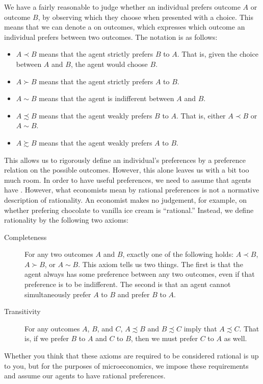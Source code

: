 We have a fairly reasonable to judge whether an individual prefers outcome $A$ or outcome $B$, by observing which they choose when presented with a choice. This means that we can denote a  on outcomes, which expresses which outcome an individual prefers between two outcomes. The notation is as follows:
\begin{itemize}
    \item $A \prec B$ means that the agent strictly prefers $B$ to $A$. That is, given the choice between $A$ and $B$, the agent would choose $B$.
    \item $A \succ B$ means that the agent strictly prefers $A$ to $B$.
    \item $A \sim B$ means that the agent is indifferent between $A$ and $B$.
    \item $A \precsim B$ means that the agent weakly prefers $B$ to $A$. That is, either $A \prec B$ or $A \sim B$.
    \item $A \succsim B$ means that the agent weakly prefers $A$ to $B$.
\end{itemize}
This allows us to rigorously define an individual's preferences by a preference relation on the possible outcomes. However, this alone leaves us with a bit too much room. In order to have useful preferences, we need to assume that agents have . However, what economists mean by rational preferences is not a normative description of rationality. An economist makes no judgement, for example, on whether prefering chocolate to vanilla ice cream is ``rational.'' Instead, we define rationality by the following two axioms:
\begin{description}
    \item[Completeness] For any two outcomes $A$ and $B$, exactly one of the following holds: $A \prec B$, $A \succ B$, or $A \sim B$. This axiom tells us two things. The first is that the agent always has some preference between any two outcomes, even if that preference is to be indifferent. The second is that an agent cannot simultaneously prefer $A$ to $B$ and prefer $B$ to $A$.
    \item[Transitivity] For any outcomes $A$, $B$, and $C$, $A \precsim B$ and $B \precsim C$ imply that $A \precsim C$. That is, if we prefer $B$ to $A$ and $C$ to $B$, then we must prefer $C$ to $A$ as well.
\end{description}
Whether you think that these axioms are required to be considered rational is up to you, but for the purposes of microeconomics, we impose these requirements and assume our agents to have rational preferences.

